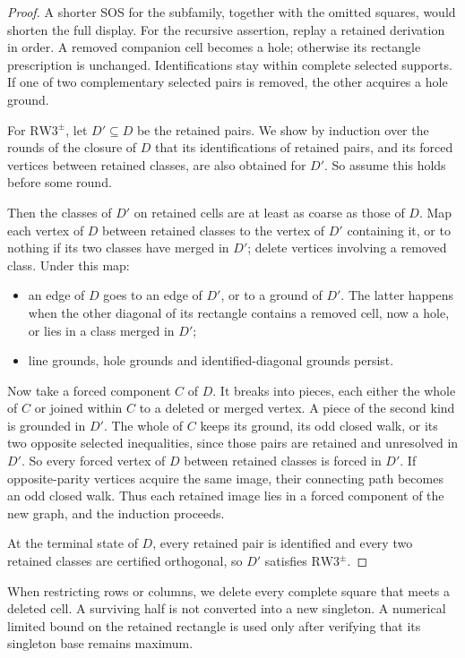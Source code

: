 \documentclass[11pt,a4paper]{article}
\theoremstyle{definition}
\newcommand{\SG}{\mathrm{RW3}^{\pm}}
\begin{document}
\begin{proof}
A shorter SOS for the subfamily, together with the omitted squares,
would shorten the full display. For the recursive assertion, replay a
retained derivation in order. A removed companion cell becomes a hole;
otherwise its rectangle prescription is unchanged. Identifications stay
within complete selected supports. If one of two complementary selected
pairs is removed, the other acquires a hole ground.

For $\SG$, let $D'\subseteq D$ be the retained pairs. We show by induction
over the rounds of the closure of $D$ that its identifications of retained
pairs, and its forced vertices between retained classes, are also obtained
for $D'$. So assume this holds before some round.

Then the classes of $D'$ on retained cells are at least as coarse as those
of $D$. Map each vertex of $D$ between retained classes to the vertex of
$D'$ containing it, or to nothing if its two classes have merged in $D'$;
delete vertices involving a removed class. Under this map:
\begin{itemize}
\item an edge of $D$ goes to an edge of $D'$, or to a ground of $D'$. The
      latter happens when the other diagonal of its rectangle contains a
      removed cell, now a hole, or lies in a class merged in $D'$;
\item line grounds, hole grounds and identified-diagonal grounds persist.
\end{itemize}

Now take a forced component $C$ of $D$. It breaks into pieces, each
either the whole of $C$ or joined within $C$ to a deleted or merged
vertex. A piece of the second kind is grounded in $D'$. The whole of $C$
keeps its ground, its odd closed walk, or its two opposite selected
inequalities, since those pairs are retained and unresolved in $D'$. So
every forced vertex of $D$ between retained classes is forced in $D'$.
If opposite-parity vertices acquire the same image, their connecting
path becomes an odd closed walk. Thus each retained image lies in a
forced component of the new graph, and the induction proceeds.

At the terminal state of $D$, every retained pair is identified and every
two retained classes are certified orthogonal, so $D'$ satisfies $\SG$.
\end{proof}

When restricting rows or columns, we delete every complete square that
meets a deleted cell. A surviving half is not converted into a new
singleton. A numerical limited bound on the retained rectangle is used
only after verifying that its singleton base remains maximum.
\end{document}
